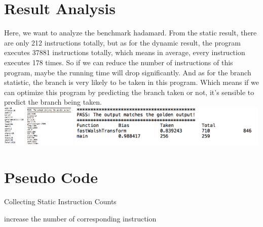 \documentclass{article}
\begin{document}
\section{Result Analysis}


Here, we want to analyze the benchmark hadamard. From the static result, there are only 212 instructions totally, but as for the dynamic result, the program executes 37881 instructions totally, which means in average, every instruction executes 178 times. So if we can reduce the number of instructions of this program, maybe the running time will drop significantly. And as for the branch statistic, the branch is very likely to be taken in this program. Which means if we can optimize this program by predicting the branch taken or not, it's sensible to predict the branch being taken.\\


\includegraphics[height=2cm]{static.png}
\includegraphics[height=2cm]{dynamic.png}
\includegraphics[height=2cm]{branch.png}\\
\section{Pseudo Code}

\begin{algorithm}[htb]
\caption{ Collecting Static Instruction Counts }
\begin{algorithmic}
			\STATE increase the number of corresponding instruction
		\ENDFOR
	\ENDFOR
\ENDFOR
\end{algorithmic}
\end{algorithm}
\end{document}
